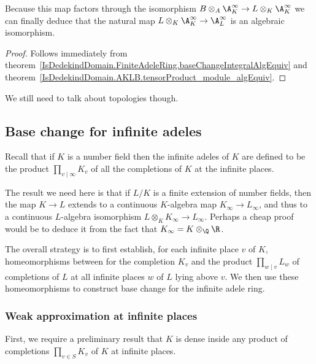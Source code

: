 Because this map factors through the isomorphism $B\otimes_A\A_K^\infty\to L\otimes_K\A_K^\infty$
we can finally deduce that the natural map $L\otimes_K\A_K^\infty\to\A_L^\infty$ is an algebraic
  isomorphism.
\begin{proof}
  Follows immediately from theorem~\ref{IsDedekindDomain.FiniteAdeleRing.baseChangeIntegralAlgEquiv}
  and theorem~\ref{IsDedekindDomain.AKLB.tensorProduct_module_algEquiv}.
\end{proof}

We still need to talk about topologies though.

\subsection{Base change for infinite adeles}

Recall that if $K$ is a number field then the infinite adeles of $K$ are defined
to be the product $\prod_{v\mid\infty} K_v$ of all the completions of $K$ at the
infinite places.

The result we need here is that if $L/K$ is a finite extension of number fields,
then the map $K\to L$ extends to a continuous $K$-algebra map $K_\infty\to L_\infty$,
and thus to a continuous $L$-algebra isomorphism $L\otimes_KK_\infty\to L_\infty$.
Perhaps a cheap proof would be to deduce it from the fact that $K_\infty=K\otimes_{\Q}\R$.

The overall strategy is to first establish, for each infinite place $v$ of $K$, homeomorphisms
between for the completion $K_v$ and the product $\prod_{w\mid v}L_w$ of completions of $L$ at
all infinite places $w$ of $L$ lying above $v$.
We then use these homeomorphisms to construct base change for the infinite adele ring.

\subsubsection{Weak approximation at infinite places}

First, we require a preliminary result that $K$ is dense inside any product of
completions $\prod_{v\in S} K_v$ of $K$ at infinite places.

